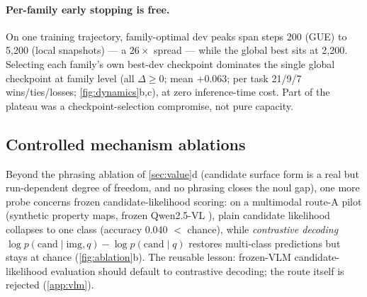 \paragraph{Per-family early stopping is free.}
On one training trajectory, family-optimal dev peaks span steps 200 (GUE) to 5{,}200
(local snapshots) --- a $26\times$ spread --- while the global best sits at 2{,}200.
Selecting each family's own best-dev checkpoint dominates the single global checkpoint at
family level (all $\Delta\ge0$; mean $+0.063$; per task 21/9/7 wins/ties/losses;
\cref{fig:dynamics}b,c), at zero inference-time cost. Part of the plateau was a
checkpoint-selection compromise, not pure capacity.

\subsection{Controlled mechanism ablations}
\label{sec:ablations}


Beyond the phrasing ablation of \cref{sec:value}d (candidate surface form is a real but
run-dependent degree of freedom, and no phrasing closes the noul gap), one more probe
concerns frozen candidate-likelihood scoring: on a multimodal route-A pilot (synthetic
property maps, frozen Qwen2.5-VL \citep{bai2025qwen25vl}), plain candidate likelihood
collapses to one class (accuracy 0.040 $<$ chance), while \emph{contrastive decoding}
$\log p(\text{cand}\mid\text{img},q)-\log p(\text{cand}\mid q)$
\citep[cf.][]{leng2024vcd,li2023contrastive} restores multi-class predictions but stays at
chance (\cref{fig:ablation}b). The reusable lesson: frozen-VLM candidate-likelihood
evaluation should default to contrastive decoding; the route itself is rejected
(\cref{app:vlm}).
